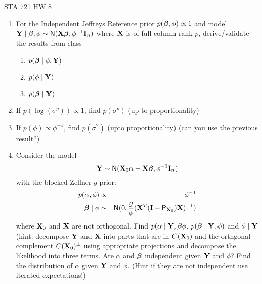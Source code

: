 \documentclass{article}
\begin{document}
\begin{center}
  STA 721 HW 8
\end{center}

\begin{enumerate}
\item For the Independent Jeffreys Reference prior $p(\boldsymbol{\beta}, \phi) \propto
  1$ and model $\mathbf{Y} \mid \boldsymbol{\beta}, \phi \sim \textsf{N}(\mathbf{X} \boldsymbol{\beta}, \phi^{-1} \mathbf{I}_n)$ where
  $\mathbf{X}$ is of full column rank $p$, derive/validate the results from class
  \begin{enumerate}
  \item $p(\boldsymbol{\beta} \mid \phi, \mathbf{Y})$
  \item $p(\phi \mid \mathbf{Y})$
  \item $p(\boldsymbol{\beta} \mid \mathbf{Y})$
  \end{enumerate}
\item If $p(\log(\sigma^p)) \propto 1$, find $p(\sigma^p)$ (up to
  proportionality)
\item If $p(\phi) \propto \phi^{-1}$, find  $p(\sigma^2)$ (upto
  proportionality) (can you use the previous result?)
\item Consider the model 
$$\mathbf{Y} \sim \textsf{N}(\mathbf{X}_0 \alpha + \mathbf{X} \boldsymbol{\beta}, \phi^{-1} \mathbf{I}_n)$$ 
with the blocked Zellner $g$-prior:
\begin{eqnarray}
  p(\alpha, \phi) &\propto& \phi^{-1} \\
 \boldsymbol{\beta} \mid \phi & \sim & \textsf{N}(0, \frac{g}{\phi} (\mathbf{X}^T(\mathbf{I}-\textsf{P}_{\mathbf{X}_0}) \mathbf{X})^{-1})
\end{eqnarray}
where $\mathbf{X}_0$ and $\mathbf{X}$ are not orthogonal.
Find $p(\alpha \mid \mathbf{Y}, \boldsymbol{\beta} \phi$, $p(\boldsymbol{\beta} \mid \mathbf{Y}, \phi)$ and $\phi \mid
\mathbf{Y}$ (hint:  decompose $\mathbf{Y}$ and  $\mathbf{X}$ into parts that are in $C(\mathbf{X}_0)$ and the
orthgonal complement $C(\mathbf{X}_0)^\perp$ using appropriate projections and
decompose the likelihood into three terms.  Are $\alpha$ and $\boldsymbol{\beta}$ independent given
$\mathbf{Y}$ and $\phi$?  Find 
the distribution of $\alpha$ given $\mathbf{Y}$ and $\phi$.  (Hint if they are
not independent use iterated expectations!)
\end{enumerate}
\end{document}

